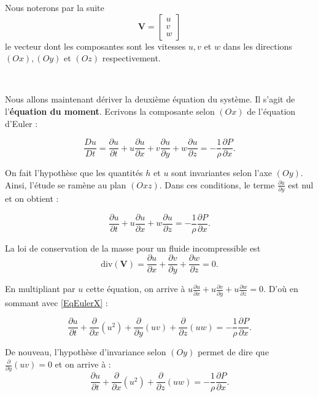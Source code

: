 \documentclass[
11pt, %
francais, %
singlespacing, %
headsepline, %
]{MastersDoctoralThesis} %
\begin{document}
Nous noterons par la suite $$\textbf{V}=\begin{bmatrix}u\\ v \\ w \end{bmatrix}$$ le vecteur dont les composantes sont les vitesses $u, v$ et $w$ dans les directions $(Ox), (Oy)$ et $(Oz)$ respectivement.

\

Nous allons maintenant dériver la deuxième équation du système. Il s'agit de l'\textbf{équation du moment}. Ecrivons la composante selon $(Ox)$ de l'équation d'Euler : 

\begin{equation}
\frac{Du}{Dt} = \frac{\partial u}{\partial t}+u\frac{\partial u}{\partial x}+v\frac{\partial u}{\partial y}+w\frac{\partial u}{\partial z}=-\frac{1}{\rho}\frac{\partial P}{\partial x}. \label{EqEulerX}
\end{equation}

On fait l'hypothèse que les quantités $h$ et $u$ sont invariantes selon l'axe $(Oy)$. Ainsi, l'étude se ramène au plan $(Oxz)$. Dans ces conditions, le terme $\frac{\partial u}{\partial y}$ est nul et on obtient :

\begin{equation}
\frac{\partial u}{\partial t}+u\frac{\partial u}{\partial x}+w\frac{\partial u}{\partial z}=-\frac{1}{\rho}\frac{\partial P}{\partial x}.
\end{equation}

La loi de conservation de la masse pour un fluide incompressible est
\begin{equation}
\text{div}(\textbf{V})=\frac{\partial u}{\partial x}+\frac{\partial v}{\partial y}+\frac{\partial w}{\partial z}=0. \label{eq:Romain}
\end{equation}

En multipliant par $u$ cette équation,
on arrive à  $u\frac{\partial u}{\partial x}+u\frac{\partial v}{\partial y}+u\frac{\partial w}{\partial z}=0$. D'où en sommant avec \eqref{EqEulerX} :

\begin{equation}
\frac{\partial u}{\partial t}+\frac{\partial}{\partial x} (u^{2})+\frac{\partial}{\partial y}(uv)+\frac{\partial }{\partial z}(uw)=-\frac{1}{\rho}\frac{\partial P}{\partial x}.
\end{equation}

De nouveau, l'hypothèse d'invariance selon $(Oy)$ permet de dire que $\frac{\partial}{\partial y}(uv)=0$ et on arrive à :
\begin{equation}
\frac{\partial u}{\partial t}+\frac{\partial}{\partial x} (u^{2})+\frac{\partial }{\partial z}(uw)=-\frac{1}{\rho}\frac{\partial P}{\partial x}.
\end{equation}
\end{document}
